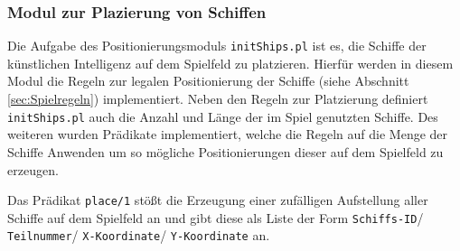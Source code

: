 \subsubsection{Modul zur Plazierung von Schiffen} \label{sec:initships}	
	Die Aufgabe des Positionierungsmoduls \texttt{initShips.pl} ist es, die Schiffe der künstlichen Intelligenz auf dem Spielfeld zu platzieren.
	Hierfür werden in diesem Modul die Regeln zur legalen Positionierung der Schiffe (siehe Abschnitt \ref{sec:Spielregeln}) implementiert. Neben den Regeln 
	zur Platzierung definiert \texttt{initShips.pl} auch die Anzahl und Länge der im Spiel genutzten Schiffe. Des weiteren wurden Prädikate implementiert, 
	welche die Regeln auf die Menge der Schiffe Anwenden um so mögliche Positionierungen dieser auf dem Spielfeld zu erzeugen.
	
	Das Prädikat \texttt{place/1} stößt die Erzeugung einer zufälligen Aufstellung aller Schiffe auf dem Spielfeld an und gibt diese als Liste der Form 
	\texttt{Schiffs-ID}/ \texttt{Teilnummer}/ \texttt{X-Koordinate}/ \texttt{Y-Koordinate} an.
	
